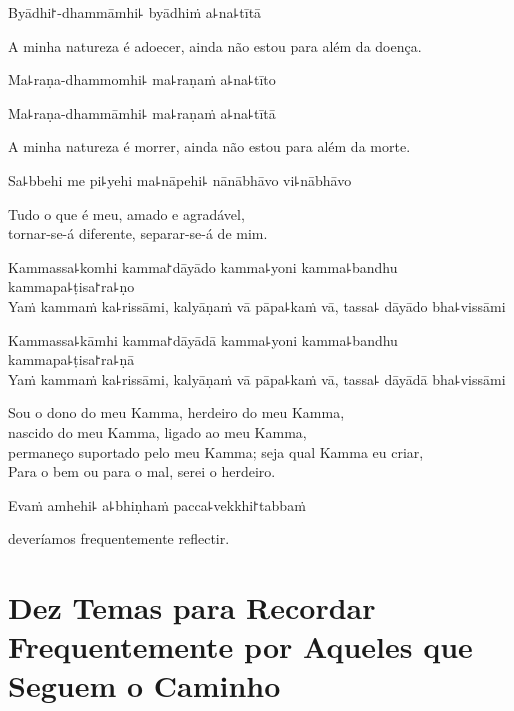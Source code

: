 %
Byādhi꜓-dhammāmhi꜕ byādhiṁ a꜕na꜕tītā

\begin{english}
  A minha natureza é adoecer, ainda não estou para além da doença.
\end{english}

%
Ma꜕raṇa-dhammomhi꜕ ma꜕raṇaṁ a꜕na꜕tīto

%
Ma꜕raṇa-dhammāmhi꜕ ma꜕raṇaṁ a꜕na꜕tītā

\begin{english}
  A minha natureza é morrer, ainda não estou para além da morte.
\end{english}

Sa꜕bbehi me pi꜕yehi ma꜕nāpehi꜕ nānābhāvo vi꜕nābhāvo

\begin{english}
  Tudo o que é meu, amado e agradável,\\
  tornar-se-á diferente, separar-se-á de mim.
\end{english}

%
Kammassa꜕komhi kamma꜓dāyādo kamma꜕yoni kamma꜕bandhu kammapa꜕ṭisa꜓ra꜕ṇo\\
Yaṁ kammaṁ ka꜕rissāmi, kalyāṇaṁ vā pāpa꜕kaṁ vā, tassa꜕ dāyādo bha꜕vissāmi

\clearpage

%
Kammassa꜕kāmhi kamma꜓dāyādā kamma꜕yoni kamma꜕bandhu kammapa꜕ṭisa꜓ra꜕ṇā\\
Yaṁ kammaṁ ka꜕rissāmi, kalyāṇaṁ vā pāpa꜕kaṁ vā, tassa꜕ dāyādā bha꜕vissāmi

\begin{english}
  Sou o dono do meu Kamma, herdeiro do meu Kamma,\\
  nascido do meu Kamma, ligado ao meu Kamma,\\
  permaneço suportado pelo meu Kamma; seja qual Kamma eu criar,\\
  Para o bem ou para o mal,  serei o herdeiro.
\end{english}

Evaṁ amhehi꜕ a꜕bhiṇhaṁ pacca꜕vekkhi꜓tabbaṁ

\begin{english}
   deveríamos frequentemente reflectir.
\end{english}

\chapter[Dez Temas]{Dez Temas para Recordar Frequentemente por Aqueles que Seguem o Caminho}

